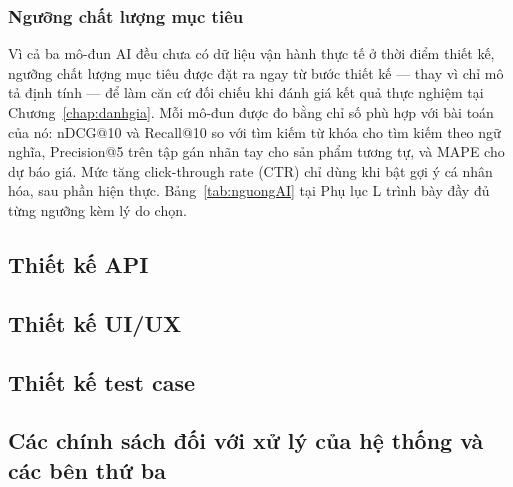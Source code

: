\subsubsection*{Ngưỡng chất lượng mục tiêu}
\label{subsec:nguongAI}

Vì cả ba mô-đun AI đều chưa có dữ liệu vận hành thực tế ở thời điểm thiết kế, ngưỡng chất lượng mục tiêu được đặt ra ngay từ bước thiết kế --- thay vì chỉ mô tả định tính --- để làm căn cứ đối chiếu khi đánh giá kết quả thực nghiệm tại Chương~\ref{chap:danhgia}. Mỗi mô-đun được đo bằng chỉ số phù hợp với bài toán của nó: nDCG@10 và Recall@10 so với tìm kiếm từ khóa cho tìm kiếm theo ngữ nghĩa, Precision@5 trên tập gán nhãn tay cho sản phẩm tương tự, và MAPE cho dự báo giá. Mức tăng click-through rate (CTR) chỉ dùng khi bật gợi ý cá nhân hóa, sau phần hiện thực. Bảng~\ref{tab:nguongAI} tại Phụ lục L trình bày đầy đủ từng ngưỡng kèm lý do chọn.


\subsection{Thiết kế API}

\subsection{Thiết kế UI/UX}

\subsection{Thiết kế test case}
\label{sec:kichbankiemthu}

\subsection{Các chính sách đối với xử lý của hệ thống và các bên thứ ba}
\label{subsec:chinhsachbenthuba}


